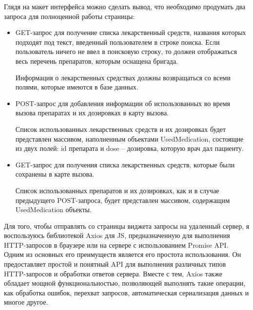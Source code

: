 Глядя на макет интерфейса можно сделать вывод, что необходимо продумать два запроса для полноценной работы страницы:
\begin{itemize}
    \item GET-запрос для получение списка лекарственный средств, названия которых подходят под текст, введенный пользователем в строке поиска. Если пользователь ничего не ввел в поисковую строку, то должен отображаться весь перечень препаратов, которым оснащена бригада.

    Информация о лекарственных средствах должны возвращаться со всеми полями, которые имеются в базе данных.

    \item POST-запрос для добавления информации об использованных во время вызова препаратах и их дозировках в карту вызова.

    Список использованных лекарственных средств и их дозировках будет представлен массивом, наполненным объектами UsedMedication, состоящие из двух полей: id препарата и dose -- дозировка, которую врач дал пациенту.
    
    \item GET-запрос для получения списка лекарственных средств, которые были сохранены в карте вызова.

    Список использованных препаратов и их дозировках, как и в случае предыдущего POST-запроса, будет представлен массивом, содержащим UsedMedication объекты.
\end{itemize}

Для того, чтобы отправлять со страницы виджета запросы на удаленный сервер, я воспользуюсь библиотекой Axios для JS, предназначенную для выполнения HTTP-запросов в браузере или на сервере с использованием Promise API. Одним из основных его преимуществ является его простота использования. Он предоставляет простой и понятный API для выполнения различных типов HTTP-запросов и обработки ответов сервера. Вместе с тем, Axios также обладает мощной функциональностью, позволяющей выполнять такие операции, как обработка ошибок, перехват запросов, автоматическая сериализация данных и многое другое.
